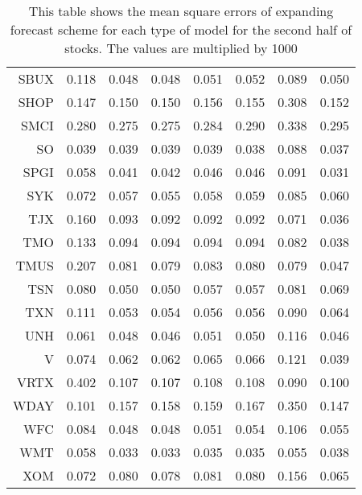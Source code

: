 \begin{table}[ht]
\begin{tabular}{rrrrrrrr}
  SBUX & 0.118 & 0.048 & 0.048 & 0.051 & 0.052 & 0.089 & 0.050 \\ 
  SHOP & 0.147 & 0.150 & 0.150 & 0.156 & 0.155 & 0.308 & 0.152 \\ 
  SMCI & 0.280 & 0.275 & 0.275 & 0.284 & 0.290 & 0.338 & 0.295 \\ 
  SO & 0.039 & 0.039 & 0.039 & 0.039 & 0.038 & 0.088 & 0.037 \\ 
  SPGI & 0.058 & 0.041 & 0.042 & 0.046 & 0.046 & 0.091 & 0.031 \\ 
  SYK & 0.072 & 0.057 & 0.055 & 0.058 & 0.059 & 0.085 & 0.060 \\ 
  TJX & 0.160 & 0.093 & 0.092 & 0.092 & 0.092 & 0.071 & 0.036 \\ 
  TMO & 0.133 & 0.094 & 0.094 & 0.094 & 0.094 & 0.082 & 0.038 \\ 
  TMUS & 0.207 & 0.081 & 0.079 & 0.083 & 0.080 & 0.079 & 0.047 \\ 
  TSN & 0.080 & 0.050 & 0.050 & 0.057 & 0.057 & 0.081 & 0.069 \\ 
  TXN & 0.111 & 0.053 & 0.054 & 0.056 & 0.056 & 0.090 & 0.064 \\ 
  UNH & 0.061 & 0.048 & 0.046 & 0.051 & 0.050 & 0.116 & 0.046 \\ 
  V & 0.074 & 0.062 & 0.062 & 0.065 & 0.066 & 0.121 & 0.039 \\ 
  VRTX & 0.402 & 0.107 & 0.107 & 0.108 & 0.108 & 0.090 & 0.100 \\ 
  WDAY & 0.101 & 0.157 & 0.158 & 0.159 & 0.167 & 0.350 & 0.147 \\ 
  WFC & 0.084 & 0.048 & 0.048 & 0.051 & 0.054 & 0.106 & 0.055 \\ 
  WMT & 0.058 & 0.033 & 0.033 & 0.035 & 0.035 & 0.055 & 0.038 \\ 
  XOM & 0.072 & 0.080 & 0.078 & 0.081 & 0.080 & 0.156 & 0.065 \\ 
   \hline
\end{tabular}
\caption[MSE expanding forecast (2)]{This table shows the mean square errors of expanding forecast scheme for each type of model for the second half of stocks. 
                     The values are multiplied by 1000} 
\label{Table:MSE_e_2}
\end{table}
